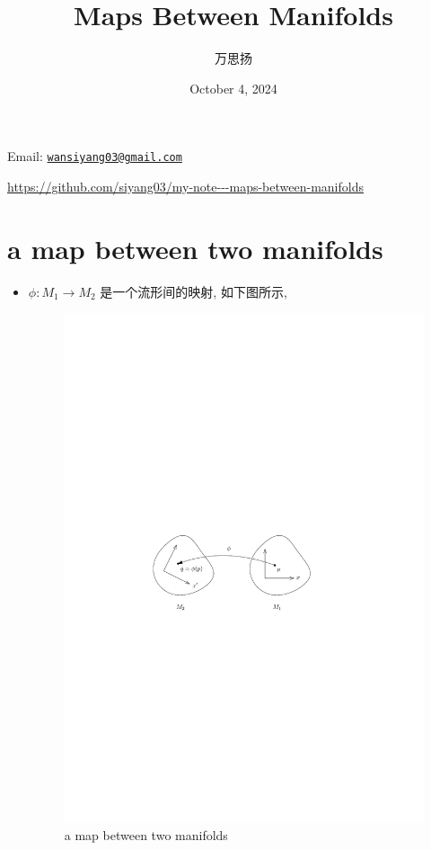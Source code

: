 \documentclass[10pt, a4paper]{article}
\title{\Huge \textbf{Maps Between Manifolds}}
\author{万思扬}
\date{October 4, 2024}
\numberwithin{equation}{section}
\begin{document}
	\maketitle
	
	Email: \href{mailto:wansiyang03@gmail.com}{\texttt{wansiyang03@gmail.com}}
	
	\url{https://github.com/siyang03/my-note---maps-between-manifolds}
	
	\tableofcontents
	
	\section{a map between two manifolds}
	\begin{itemize}
		\item $\phi : M_1 \rightarrow M_2$ 是一个流形间的映射, 如下图所示,
		
		\begin{figure}[H]
			\centering
			\includegraphics[scale=1]{figures/a map between two manifolds.pdf}
			\caption{a map between two manifolds}
		\end{figure}
	\end{itemize}
	
\end{document}
